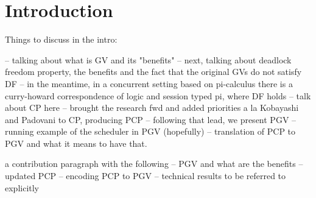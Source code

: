 \documentclass[main.tex]{subfiles}
\begin{document}
\section{Introduction}

Things to discuss in the intro:

-- talking about what is GV and its "benefits"
-- next, talking about deadlock freedom property, the benefits and the fact that the original GVs do not satisfy DF
-- in the meantime, in a concurrent setting based on pi-calculus there is a curry-howard correspondence of logic and session typed pi, where DF holds
-- talk about CP here
-- \cite{dardha2018} brought the research fwd and added priorities a la Kobayashi and Padovani to CP, producing PCP
-- following that lead, we present PGV
-- running example of the scheduler in PGV (hopefully)
-- translation of PCP to PGV and what it means to have that.

a contribution paragraph with the following
-- PGV and what are the benefits
-- updated PCP
-- encoding PCP to PGV
-- technical results to be referred to explicitly
\end{document}
